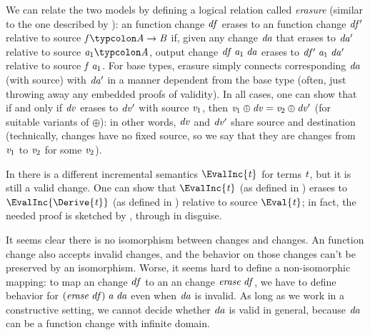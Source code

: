 We can relate the two models by defining a logical relation called
\emph{erasure} (similar to the one described by \citeauthor{CaiEtAl2014ILC}): an
\ilcA{} function change \ensuremath{\Varid{df}} erases to an \ilcB{} function change \ensuremath{\Varid{df'}} relative
to source \ensuremath{\Varid{f}\typcolon\Conid{A}\to \Conid{B}} if, given any change \ensuremath{\Varid{da}} that erases
to \ensuremath{\Varid{da'}} relative to source \ensuremath{\Varid{a}_{1}\typcolon\Conid{A}}, output change \ensuremath{\Varid{df}\;\Varid{a}_{1}\;\Varid{da}} erases to \ensuremath{\Varid{df'}\;\Varid{a}_{1}\;\Varid{da'}} relative to source \ensuremath{\Varid{f}\;\Varid{a}_{1}}.
For base types, erasure simply connects corresponding \ensuremath{\Varid{da}} (with source) with
\ensuremath{\Varid{da'}} in a manner dependent from the base type (often, just throwing away any
embedded proofs of validity).
In all cases, one can show that if and only if \ensuremath{\Varid{dv}} erases to \ensuremath{\Varid{dv'}} with source
\ensuremath{\Varid{v}_{1}}, then \ensuremath{\Varid{v}_{1}\oplus \Varid{dv}\mathrel{=}\Varid{v}_{2}\oplus \Varid{dv'}} (for suitable variants of \ensuremath{\oplus }):
in other words, \ensuremath{\Varid{dv}} and \ensuremath{\Varid{dv'}} share source and destination (technically,
\ilcB{} changes have no fixed source, so we say that they are changes from \ensuremath{\Varid{v}_{1}}
to \ensuremath{\Varid{v}_{2}} for some \ensuremath{\Varid{v}_{2}}).

In \ilcA{} there is a different incremental semantics \ensuremath{\EvalInc{\Varid{t}}} for terms \ensuremath{\Varid{t}},
but it is still a valid \ilcA{} change. One can show that \ensuremath{\EvalInc{\Varid{t}}} (as
defined in \ilcA{}) erases to \ensuremath{\EvalInc{\Derive{\Varid{t}}}} (as defined in \ilcB{}) relative to
source \ensuremath{\Eval{\Varid{t}}}; in fact, the needed proof is sketched by
\citeauthor{CaiEtAl2014ILC}, through in disguise.

It seems clear there is no isomorphism between \ilcA{} changes and \ilcB{} changes.
An \ilcB{} function change also accepts invalid changes, and the behavior on
those changes can't be preserved by an isomorphism.
Worse, it seems hard to define a non-isomorphic mapping:
to map an \ilcA{} change \ensuremath{\Varid{df}} to an an \ilcB{} change \ensuremath{\Varid{erase}\;\Varid{df}}, we have to
define behavior for \ensuremath{(\Varid{erase}\;\Varid{df})\;\Varid{a}\;\Varid{da}} even when \ensuremath{\Varid{da}} is invalid.
As long as we work in a constructive setting,
we cannot decide whether \ensuremath{\Varid{da}} is valid in general, because \ensuremath{\Varid{da}} can be a
function change with infinite domain.

